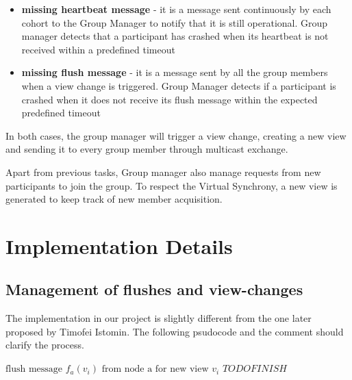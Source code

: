 \documentclass[11pt]{article}
\begin{document}
	\begin{itemize}
		\item \textbf{missing heartbeat message} - it is a message sent continuously by each cohort to the Group Manager to notify that it is still operational. Group manager detects that a participant has crashed when its heartbeat is not received within a predefined timeout
		\item \textbf{missing flush message} - it is a message sent by all the group members when a view change is triggered. Group Manager detects if a participant is crashed when it does not receive its flush message within the expected predefined timeout
	\end{itemize}
	In both cases, the group manager will trigger a view change, creating a new view and sending it to every group member through multicast exchange.
	
	Apart from previous tasks, Group manager also manage requests from new participants to join the group. To respect the Virtual Synchrony, a new view is generated to keep track of new member acquisition.
	
	
	\section{Implementation Details}
	\subsection{Management of flushes and view-changes}
	The implementation in our project is slightly different from the one later proposed by Timofei Istomin. The following psudocode and the comment should clarify the process.
	
	\begin{algorithm}
		\begin{algorithmic}
		\REQUIRE $\text{flush message }f_{a}(v_{i}) \text{ from node a for new view } v_{i} $
		\STATE $ TODO FINISH$
		\end{algorithmic}		
	\end{algorithm}
	
\end{document}
